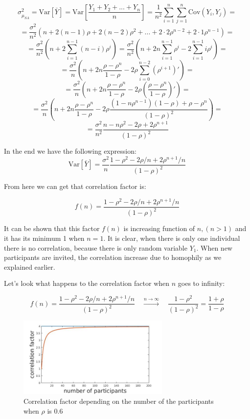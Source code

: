 \documentclass[12pt]{report}
\begin{document}
$$\sigma^2_{\hat{\mu}_{SA}} = \mathrm{Var}\left[\bar{Y} \right] = \mathrm{Var}\left[ \frac{Y_1 + Y_2 + ...+ Y_n}{n} \right] = \frac{1}{n^2} \sum_{i=1}^{n}\sum_{j=1}^{n} \mathrm{Cov}(Y_i, Y_j) =$$ 
$$ = \frac{\sigma^2}{n^2} \left( n + 2(n-1)\rho + 2(n-2)\rho^2 + ... + 2\cdot2 \rho^{n-2}+ 2\cdot1 \rho^{n-1} \right) = $$
$$ = \frac{\sigma^2}{n^2} \left(n + 2\sum_{i=1}^{n-1} (n-i)\rho^i \right) = \frac{\sigma^2}{n^2} \left(n + 2n\sum_{i=1}^{n-1}\rho^i - 2\sum_{i=1}^{n-1}i\rho^i \right) = $$
$$ = \frac{\sigma^2}{n} \left(n + 2n\frac{\rho-\rho^{n}}{1-\rho} - 2\rho \sum_{i=0}^{n-2} (\rho^{i+1})' \right) = $$
$$ = \frac{\sigma^2}{n} \left(n + 2n\frac{\rho-\rho^{n}}{1-\rho} - 2\rho\left(\frac{\rho-\rho^n}{1-\rho}\right)' \right) = $$
$$ = \frac{\sigma^2}{n} \left(n + 2n\frac{\rho-\rho^{n}}{1-\rho} - 2\rho \frac{(1-n\rho^{n-1})(1-\rho) + \rho - \rho^n}{(1-\rho)^2} \right) = $$
$$ = \frac{\sigma^2}{n^2} \frac{n-n\rho^2 - 2\rho + 2\rho^{n+1}}{(1-\rho)^2}$$

In the end we have the following expression:
\begin{equation}\label{eq:varFirst}
\mathrm{Var}\left[\bar{Y} \right] = \frac{\sigma^2}{n}\frac{1-\rho^2 - 2\rho/n + 2\rho^{n+1}/n}{(1-\rho)^2}
\end{equation}


From here we can get that correlation factor is:

$$f(n) = \frac{1-\rho^2 - 2\rho/n + 2\rho^{n+1}/n}{(1-\rho)^2} $$

It can be shown that this factor $f(n)$ is increasing function of $n, (n > 1)$ and it has its minimum 1 when $n = 1$. It is clear, when there is only one individual there is no correlation, because there is only random variable $Y_1$. When new participants are invited, the correlation increase due to homophily as we explained earlier.

Let's look what happens to the correlation factor when $n$ goes to infinity:

$$f(n)  = \frac{1-\rho^2 - 2\rho/n + 2\rho^{n+1}/n}{(1-\rho)^2} \quad \xrightarrow{n\to \infty} \quad\frac{1-\rho^2}{(1-\rho)^2} = \frac{1+\rho}{1-\rho}$$

\begin{figure}[ht]
    \centering
    \includegraphics[height=150px]{corrFactor}
    \caption{ Correlation factor depending on the number of the participants when $\rho$ is 0.6 }
\end{figure}
\end{document}
